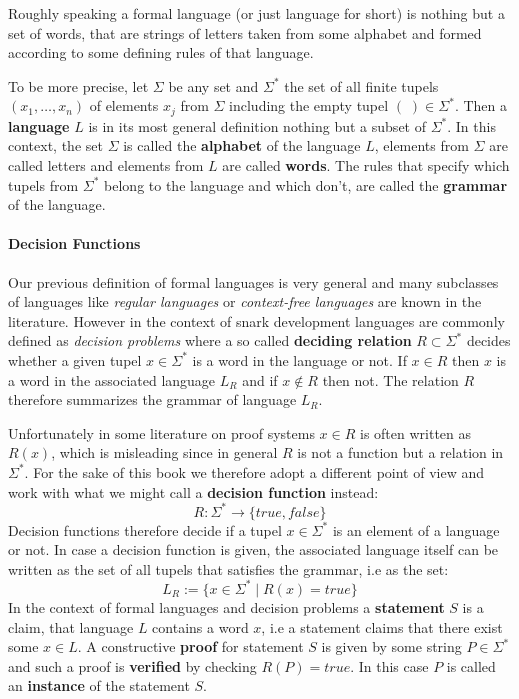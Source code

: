 Roughly speaking a formal language (or just language for short) is nothing but a set of words, that are strings of letters taken from some alphabet and formed according to some defining rules of that language. 

To be more precise, let $\Sigma$ be any set and $\Sigma^*$ the set of all finite tupels $(x_1,\ldots,x_n)$ of elements $x_j$ from $\Sigma$ including the empty tupel $(\;)\in \Sigma^*$. Then a \textbf{language} $L$ is in its most general definition nothing but a subset of $\Sigma^*$. In this context, the set $\Sigma$ is called the \textbf{alphabet} of the language $L$, elements from $\Sigma$ are called letters and elements from $L$ are called \textbf{words}. The rules that specify which tupels from $\Sigma^*$ belong to the language and which don't, are called the \textbf{grammar} of the language. 

\paragraph{Decision Functions} Our previous definition of formal languages is very general and many subclasses of languages like \textit{regular languages} or \textit{context-free languages} are known in the literature. However in the context of snark development languages are commonly defined as \textit{decision problems} where a so called \textbf{deciding relation} $R\subset \Sigma^*$ decides whether a given tupel $x\in \Sigma^*$ is a word in the language or not. If $x\in R$ then $x$ is a word in the associated language $L_R$ and if $x\notin R$ then not. The relation $R$ therefore summarizes the grammar of language $L_R$.

Unfortunately in some literature on proof systems $x\in R$ is often written as $R(x)$, which is  misleading since in general $R$ is not a function but a relation in $\Sigma^*$. For the sake of this book we therefore adopt a different point of view and work with what we might call a \textbf{decision function} instead:
\begin{equation}
R: \Sigma^* \to \{true, false\}
\end{equation}
Decision functions therefore decide if a tupel $x\in \Sigma^*$ is an element of a language or not. In case a decision function is given, the associated language itself can be written as the set of all tupels that satisfies the grammar, i.e as the set:
\begin{equation}
L_R := \{x\in \Sigma^*\;|\; R(x)=true\}
\end{equation}
In the context of formal languages and decision problems a \textbf{statement} $S$ is a claim, that language $L$ contains a word $x$, i.e a statement claims that there exist some $x\in L$. A constructive \textbf{proof} for statement $S$ is given by some string $P\in \Sigma^*$ and such a proof is \textbf{verified} by checking $R(P)=true$. In this case $P$ is called an \textbf{instance} of the statement $S$.

